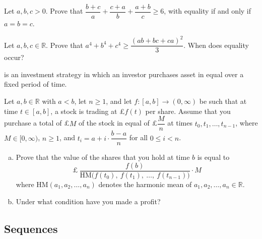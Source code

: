 \begin{chapex}
\label{cqHarmonicAndArithmeticMeans}
Let $a,b,c > 0$. Prove that $\dfrac{b+c}{a} + \dfrac{c+a}{b} + \dfrac{a+b}{c} \ge 6$, with equality if and only if $a=b=c$.
\end{chapex}

\begin{chapex}
\label{cqQMAMWithCauchySchwarz}
Let $a,b,c \in \mathbb{R}$. Prove that $a^4 + b^4 + c^4 \ge \dfrac{(ab+bc+ca)^2}{3}$. When does equality occur?
\end{chapex}

\begin{chapex}
\newcommand{\currency}{£}
\gbus{}{\renewcommand{\currency}{\$}}
 is an investment strategy in which an investor purchases asset in equal  over a fixed period of time.

Let $a,b \in \mathbb{R}$ with $a<b$, let $n \ge 1$, and let $f : [a,b] \to (0,\infty)$ be such that at time $t \in [a,b]$, a stock is trading at \currency{}$f(t)$ per share. Assume that you purchase a total of \currency{}$M$ of the stock in equal  of \currency{}$\dfrac{M}{n}$ at times $t_0, t_1, \dots, t_{n-1}$, where $M \in [0,\infty)$, $n \ge 1$, and $t_i = a + i \cdot \dfrac{b-a}{n}$ for all $0 \le i < n$.

\begin{enumerate}[(a)]
\item Prove that the value of the shares that you hold at time $b$ is equal to
\[ \text{\currency{}}~\dfrac{f(b)}{\mathrm{HM} \big ( f(t_0),~ f(t_1),~ \dots,~ f(t_{n-1}) \big)} \cdot M \]
where $\mathrm{HM}(a_1,a_2,\dots,a_n)$ denotes the harmonic mean of $a_1,a_2,\dots,a_n \in \mathbb{R}$.

\item Under what condition have you made a profit?
\end{enumerate}
\end{chapex}

\subsection*{Sequences}

